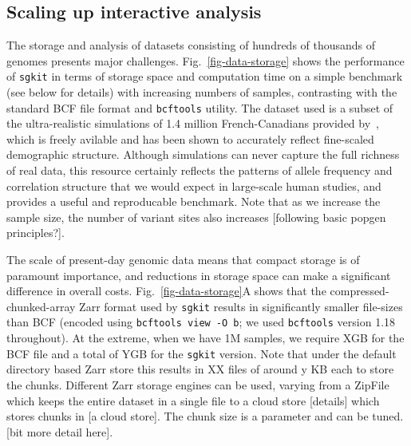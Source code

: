 \documentclass[a4paper,num-refs]{oup-contemporary}
\newcommand{\toolname}[1]{\texttt{#1}}
\begin{document}
\subsection{Scaling up interactive analysis}
The storage and analysis of datasets consisting of hundreds of
thousands of genomes presents major challenges.
Fig.~\ref{fig-data-storage} shows the performance of \toolname{sgkit}
in terms of storage space and computation time  on a simple benchmark (see
below for details) with increasing
numbers of samples, contrasting with the standard BCF file format
and \toolname{bcftools} utility.
The dataset used is a subset of the
ultra-realistic simulations of 1.4 million French-Canadians
provided by~\citet{anderson2023genes}, which is freely avilable
and has been shown to
accurately reflect fine-scaled demographic structure.
Although
simulations can never capture the full richness of real data,
this resource certainly reflects the patterns of allele frequency
and correlation structure that we would expect in large-scale
human studies, and provides a useful and reproducable benchmark.
Note that as we increase the sample size, the number of variant
sites also increases [following basic popgen principles?].

The scale of present-day genomic data means that compact
storage is of paramount importance, and reductions in storage space
can make a significant difference in overall costs.
Fig.~\ref{fig-data-storage}A shows that the
compressed-chunked-array Zarr format used by \toolname{sgkit} results
in significantly smaller file-sizes than BCF (encoded using
\texttt{bcftools view -O b}; we used \toolname{bcftools}
version 1.18 throughout). At the extreme, when we have 1M
samples, we require XGB for the BCF file and a total of YGB
for the \toolname{sgkit} version. Note that under the default
directory based Zarr store this results in XX files of around
y KB each to store the chunks. Different Zarr storage engines
can be used, varying from a ZipFile which keeps the entire
dataset in a single file to a cloud store [details] which stores
chunks in [a cloud store]. The chunk size is a parameter and
can be tuned. [bit more detail here].
\end{document}
